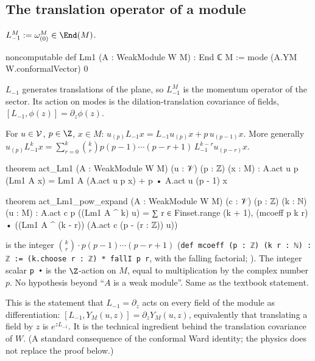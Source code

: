 \subsection{The translation operator of a module}

\begin{definition}\label{ch09:def:Lm1}
$L^M_{-1}:=\omega^M_{(0)}\in\End(M)$.
\end{definition}
\begin{leancode}
noncomputable def Lm1 (A : WeakModule W M) : End ℂ M := mode (A.YM W.conformalVector) 0
\end{leancode}

\begin{physics}
$L_{-1}$ generates translations of the plane, so $L_{-1}^M$ is the momentum operator of the sector. Its action on modes is the dilation-translation covariance of fields, $[L_{-1},\phi(z)]=\partial_z\phi(z)$.
\end{physics}

\begin{proposition}[$L_{-1}$-commutator]\label{ch09:prop:actLm1}
For $u\in\mathcal{V}$, $p\in\Z$, $x\in M$:
$u_{(p)}L_{-1}x=L_{-1}u_{(p)}x+p\,u_{(p-1)}x$.
More generally
$u_{(p)}L_{-1}^kx=\sum_{r=0}^{k}\binom{k}{r}p(p-1)\cdots(p-r+1)\,L_{-1}^{k-r}u_{(p-r)}x$.
\end{proposition}
\begin{leancode}
theorem act_Lm1 (A : WeakModule W M) (u : 𝒱) (p : ℤ) (x : M) :
    A.act u p (Lm1 A x) = Lm1 A (A.act u p x) + p • A.act u (p - 1) x

theorem act_Lm1_pow_expand (A : WeakModule W M) (c : 𝒱) (p : ℤ) (k : ℕ) (u : M) :
    A.act c p ((Lm1 A ^ k) u)
      = ∑ r ∈ Finset.range (k + 1),
          (mcoeff p k r) • ((Lm1 A ^ (k - r)) (A.act c (p - (r : ℤ)) u))
\end{leancode}

\begin{dictionary}
 is the integer $\binom{k}{r}\cdot p(p-1)\cdots(p-r+1)$
(\texttt{def mcoeff (p : ℤ) (k r : ℕ) : ℤ := (k.choose r : ℤ) * fallI p r}, with
 the falling factorial; ). The integer scalar
\texttt{p •} is the $\Z$-action on $M$, equal to multiplication by the complex number $p$. No
hypothesis beyond ``$A$ is a weak module''. Same as the textbook statement.
\end{dictionary}

\begin{physics}
This is the statement that $L_{-1}=\partial_z$ acts on every field of the module as differentiation: $[L_{-1},Y_M(u,z)]=\partial_zY_M(u,z)$, equivalently that translating a field by $z$ is $e^{zL_{-1}}$. It is the technical ingredient behind the translation covariance of $W$. (A standard consequence of the conformal Ward identity; the physics does not replace the proof below.)
\end{physics}

